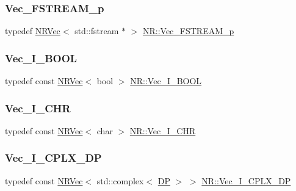 \subsubsection{\texorpdfstring{Vec\_FSTREAM\_p}{Vec\_FSTREAM\_p}}
{\footnotesize\ttfamily typedef \mbox{\hyperlink{classNR_1_1NRVec}{N\+R\+Vec}}$<$ std\+::fstream $\ast$ $>$ \mbox{\hyperlink{namespaceNR_ace6a74f7f9700e1416d49842d8ac29ea}{N\+R\+::\+Vec\+\_\+\+F\+S\+T\+R\+E\+A\+M\+\_\+p}}}

\mbox{\label{namespaceNR_a70331f3de2cf735819b5719e4048d7f3}} 
\subsubsection{\texorpdfstring{Vec\_I\_BOOL}{Vec\_I\_BOOL}}
{\footnotesize\ttfamily typedef const \mbox{\hyperlink{classNR_1_1NRVec}{N\+R\+Vec}}$<$ bool $>$ \mbox{\hyperlink{namespaceNR_a70331f3de2cf735819b5719e4048d7f3}{N\+R\+::\+Vec\+\_\+\+I\+\_\+\+B\+O\+OL}}}

\mbox{\label{namespaceNR_a7083dedcad2ce48148f379b9937b1a30}} 
\subsubsection{\texorpdfstring{Vec\_I\_CHR}{Vec\_I\_CHR}}
{\footnotesize\ttfamily typedef const \mbox{\hyperlink{classNR_1_1NRVec}{N\+R\+Vec}}$<$ char $>$ \mbox{\hyperlink{namespaceNR_a7083dedcad2ce48148f379b9937b1a30}{N\+R\+::\+Vec\+\_\+\+I\+\_\+\+C\+HR}}}

\mbox{\label{namespaceNR_ad1b14bf0517c78cb2e0c1407b08ba92b}} 
\subsubsection{\texorpdfstring{Vec\_I\_CPLX\_DP}{Vec\_I\_CPLX\_DP}}
{\footnotesize\ttfamily typedef const \mbox{\hyperlink{classNR_1_1NRVec}{N\+R\+Vec}}$<$ std\+::complex$<$ \mbox{\hyperlink{namespaceNR_af6ff762dd605ff477b8e52387253a02a}{DP}} $>$ $>$ \mbox{\hyperlink{namespaceNR_ad1b14bf0517c78cb2e0c1407b08ba92b}{N\+R\+::\+Vec\+\_\+\+I\+\_\+\+C\+P\+L\+X\+\_\+\+DP}}}

